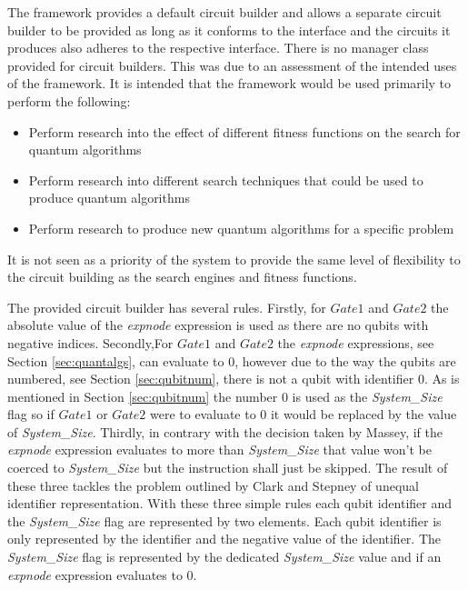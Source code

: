 The framework provides a default circuit builder and allows a separate circuit builder to be provided as long as it conforms to the interface and the circuits it produces also adheres to the respective interface.
There is no manager class provided for circuit builders.
This was due to an assessment of the intended uses of the framework.
It is intended that the framework would be used primarily to perform the following:
\begin{itemize}
  \item Perform research into the effect of different fitness functions on the search for quantum algorithms
  \item Perform research into different search techniques that could be used to produce quantum algorithms
  \item Perform research to produce new quantum algorithms for a specific problem
\end{itemize}

It is not seen as a priority of the system to provide the same level of flexibility to the circuit building as the search engines and fitness functions.

The provided circuit builder has several rules.
Firstly, for $Gate1$ and $Gate2$ the absolute value of the \emph{expnode} expression is used as there are no qubits with negative indices.
Secondly,For $Gate1$ and $Gate2$ the \emph{expnode} expressions, see Section \ref{sec:quantalgs}, can evaluate to $0$, however due to the way the qubits are numbered, see Section \ref{sec:qubitnum}, there is not a qubit with identifier $0$.
As is mentioned in Section \ref{sec:qubitnum} the number $0$ is used as the \emph{System\_Size} flag so if $Gate1$ or $Gate2$ were to evaluate to $0$ it would be replaced by the value of \emph{System\_Size}.
Thirdly, in contrary with the decision taken by Massey\cite{masseythesis}, if the \emph{expnode} expression evaluates to more than \emph{System\_Size} that value won't be coerced to \emph{System\_Size} but the instruction shall just be skipped.
The result of these three tackles the problem outlined by Clark and Stepney\cite{Stepney07searchingfor} of unequal identifier representation.
With these three simple rules each qubit identifier and the \emph{System\_Size} flag are represented by two elements.
Each qubit identifier is only represented by the identifier and the negative value of the identifier.
The \emph{System\_Size} flag is represented by the dedicated \emph{System\_Size} value and if an \emph{expnode} expression evaluates to $0$.

